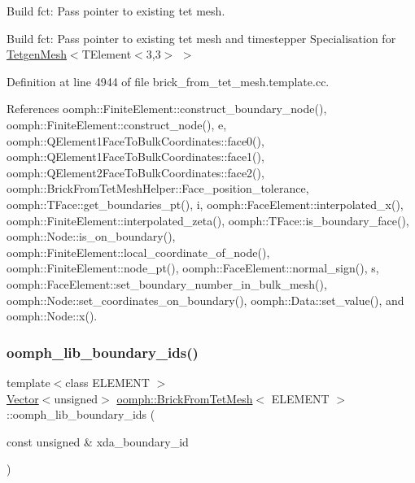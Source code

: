 Build fct\+: Pass pointer to existing tet mesh. 

Build fct\+: Pass pointer to existing tet mesh and timestepper Specialisation for \hyperlink{classoomph_1_1TetgenMesh}{Tetgen\+Mesh}$<$T\+Element$<$3,3$>$ $>$ 

Definition at line 4944 of file brick\+\_\+from\+\_\+tet\+\_\+mesh.\+template.\+cc.



References oomph\+::\+Finite\+Element\+::construct\+\_\+boundary\+\_\+node(), oomph\+::\+Finite\+Element\+::construct\+\_\+node(), e, oomph\+::\+Q\+Element1\+Face\+To\+Bulk\+Coordinates\+::face0(), oomph\+::\+Q\+Element1\+Face\+To\+Bulk\+Coordinates\+::face1(), oomph\+::\+Q\+Element2\+Face\+To\+Bulk\+Coordinates\+::face2(), oomph\+::\+Brick\+From\+Tet\+Mesh\+Helper\+::\+Face\+\_\+position\+\_\+tolerance, oomph\+::\+T\+Face\+::get\+\_\+boundaries\+\_\+pt(), i, oomph\+::\+Face\+Element\+::interpolated\+\_\+x(), oomph\+::\+Finite\+Element\+::interpolated\+\_\+zeta(), oomph\+::\+T\+Face\+::is\+\_\+boundary\+\_\+face(), oomph\+::\+Node\+::is\+\_\+on\+\_\+boundary(), oomph\+::\+Finite\+Element\+::local\+\_\+coordinate\+\_\+of\+\_\+node(), oomph\+::\+Finite\+Element\+::node\+\_\+pt(), oomph\+::\+Face\+Element\+::normal\+\_\+sign(), s, oomph\+::\+Face\+Element\+::set\+\_\+boundary\+\_\+number\+\_\+in\+\_\+bulk\+\_\+mesh(), oomph\+::\+Node\+::set\+\_\+coordinates\+\_\+on\+\_\+boundary(), oomph\+::\+Data\+::set\+\_\+value(), and oomph\+::\+Node\+::x().

\mbox{\label{classoomph_1_1BrickFromTetMesh_aeca8c8e899bdafb9eb24f36c500c7df6}} 
\subsubsection{\texorpdfstring{oomph\+\_\+lib\+\_\+boundary\+\_\+ids()}{oomph\_lib\_boundary\_ids()}}
{\footnotesize\ttfamily template$<$class E\+L\+E\+M\+E\+NT $>$ \\
\hyperlink{classoomph_1_1Vector}{Vector}$<$unsigned$>$ \hyperlink{classoomph_1_1BrickFromTetMesh}{oomph\+::\+Brick\+From\+Tet\+Mesh}$<$ E\+L\+E\+M\+E\+NT $>$\+::oomph\+\_\+lib\+\_\+boundary\+\_\+ids (\begin{DoxyParamCaption}\item[{const unsigned \&}]{xda\+\_\+boundary\+\_\+id }\end{DoxyParamCaption})\hspace{0.3cm}{\ttfamily [inline]}}



